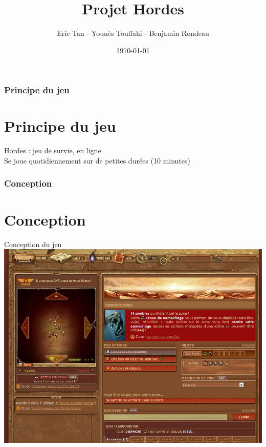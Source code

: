 \documentclass{beamer}
\begin{document}
    \title {\textbf {Projet Hordes}}
    \author{Eric Tan - Younès Touffahi - Benjamin Rondeau}
    \date{\today}
    \maketitle
    
    
    \begin{frame}
        \frametitle{Principe du jeu}
        \section{Principe du jeu}
        Hordes : jeu de survie, en ligne
        \\ Se joue quotidiennement sur de petites durées (10 minutes)
    \end{frame}
  
    
    \begin{frame}
        \frametitle{Conception}
        \section{Conception}
        Conception du jeu
        \includegraphics[width=\textwidth] {hordes.jpg}
    \end{frame}
    
\end{document}
